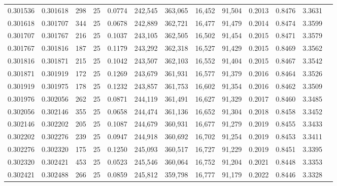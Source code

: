 \begin{tabular}{rrrrrrrrrrrrr}
0.301536 & 0.301618 &   298 &  25 &                                     0.0774 & 242,545 & 363,065 &  16,452 &  91,504 & 0.2013 & 0.8476 & 3.3631 \\
0.301618 & 0.301707 &   344 &  25 &                                     0.0678 & 242,889 & 362,721 &  16,477 &  91,479 & 0.2014 & 0.8474 & 3.3599 \\
0.301707 & 0.301767 &   216 &  25 &                                     0.1037 & 243,105 & 362,505 &  16,502 &  91,454 & 0.2015 & 0.8471 & 3.3579 \\
0.301767 & 0.301816 &   187 &  25 &                                     0.1179 & 243,292 & 362,318 &  16,527 &  91,429 & 0.2015 & 0.8469 & 3.3562 \\
0.301816 & 0.301871 &   215 &  25 &                                     0.1042 & 243,507 & 362,103 &  16,552 &  91,404 & 0.2015 & 0.8467 & 3.3542 \\
0.301871 & 0.301919 &   172 &  25 &                                     0.1269 & 243,679 & 361,931 &  16,577 &  91,379 & 0.2016 & 0.8464 & 3.3526 \\
0.301919 & 0.301975 &   178 &  25 &                                     0.1232 & 243,857 & 361,753 &  16,602 &  91,354 & 0.2016 & 0.8462 & 3.3509 \\
0.301976 & 0.302056 &   262 &  25 &                                     0.0871 & 244,119 & 361,491 &  16,627 &  91,329 & 0.2017 & 0.8460 & 3.3485 \\
0.302056 & 0.302146 &   355 &  25 &                                     0.0658 & 244,474 & 361,136 &  16,652 &  91,304 & 0.2018 & 0.8458 & 3.3452 \\
0.302146 & 0.302202 &   205 &  25 &                                     0.1087 & 244,679 & 360,931 &  16,677 &  91,279 & 0.2019 & 0.8455 & 3.3433 \\
0.302202 & 0.302276 &   239 &  25 &                                     0.0947 & 244,918 & 360,692 &  16,702 &  91,254 & 0.2019 & 0.8453 & 3.3411 \\
0.302276 & 0.302320 &   175 &  25 &                                     0.1250 & 245,093 & 360,517 &  16,727 &  91,229 & 0.2019 & 0.8451 & 3.3395 \\
0.302320 & 0.302421 &   453 &  25 &                                     0.0523 & 245,546 & 360,064 &  16,752 &  91,204 & 0.2021 & 0.8448 & 3.3353 \\
0.302421 & 0.302488 &   266 &  25 &                                     0.0859 & 245,812 & 359,798 &  16,777 &  91,179 & 0.2022 & 0.8446 & 3.3328 \\

\end{tabular}
